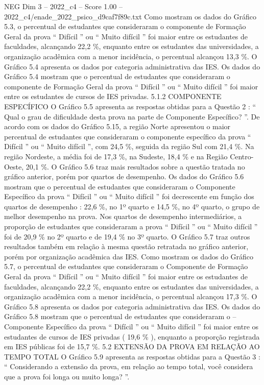 \begin{textsample}{NEG Dim 3 – 2022\_c4 – Score 1.00 – 2022\_c4/enade\_2022\_psico\_d9caf7f89c.txt}
Como mostram os dados do Gráfico 5.3, o percentual de estudantes que consideraram o componente de Formação Geral da prova “ Difícil ” ou “ Muito difícil ” foi maior entre os estudantes de faculdades, alcançando 22,2 \%, enquanto entre os estudantes das universidades, a organização acadêmica com a menor incidência, o percentual alcançou 13,3 \%.
O Gráfico 5.4 apresenta os dados por categoria administrativa das IES.
Os dados do Gráfico 5.4 mostram que o percentual de estudantes que consideraram o componente de Formação Geral da prova “ Difícil ” ou “ Muito difícil ” foi maior entre os estudantes de cursos de IES privadas. 5.1.2 COMPONENTE ESPECÍFICO O Gráfico 5.5 apresenta as respostas obtidas para a Questão 2 : “ Qual o grau de dificuldade desta prova na parte de Componente Específico? ”.
De acordo com os dados do Gráfico 5.15, a região Norte apresentou o maior percentual de estudantes que consideraram o componente específico da prova “ Difícil ” ou “ Muito difícil ”, com 24,5 \%, seguida da região Sul com 21,4 \%.
Na região Nordeste, a média foi de 17,3 \%, na Sudeste, 18,4 \% e na Região Centro-Oeste, 20,1 \%.
O Gráfico 5.6 traz mais resultados sobre a questão tratada no gráfico anterior, porém por quartos de desempenho.
Os dados do Gráfico 5.6 mostram que o percentual de estudantes que consideraram o Componente Específico da prova “ Difícil ” ou “ Muito difícil ” foi decrescente em função dos quartos de desempenho : 22,6 \%, no 1º quarto e 14,5 \%, no 4º quarto, o grupo de melhor desempenho na prova.
Nos quartos de desempenho intermediários, a proporção de estudantes que consideraram a prova “ Difícil ” ou “ Muito difícil ” foi de 20,9 \% no 2º quarto e de 19,4 \% no 3º quarto.
O Gráfico 5.7 traz outros resultados também em relação à mesma questão retratada no gráfico anterior, porém por organização acadêmica das IES.
Como mostram os dados do Gráfico 5.7, o percentual de estudantes que consideraram o Componente de Formação Geral da prova “ Difícil ” ou “ Muito difícil ” foi maior entre os estudantes de faculdades, alcançando 22,2 \%, enquanto entre os estudantes das universidades, a organização acadêmica com a menor incidência, o percentual alcançou 17,3 \%.
O Gráfico 5.8 apresenta os dados por categoria administrativa das IES.
Os dados do Gráfico 5.8 mostram que o percentual de estudantes que consideraram o – Componente Específico da prova “ Difícil ” ou “ Muito difícil ” foi maior entre os estudantes de cursos de IES privadas ( 19,6 \% ), enquanto a proporção registrada em IES públicas foi de 15,7 \%. 5.2 EXTENSÃO DA PROVA EM RELAÇÃO AO TEMPO TOTAL O Gráfico 5.9 apresenta as respostas obtidas para a Questão 3 : “ Considerando a extensão da prova, em relação ao tempo total, você considera que a prova foi longa ou muito longa? ”.

\end{textsample}

